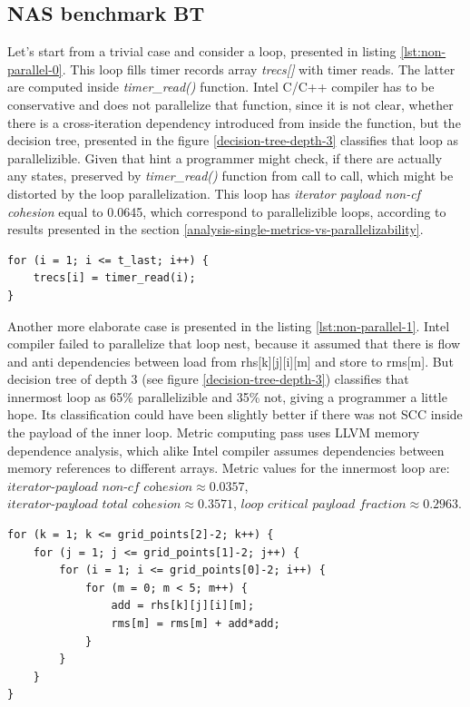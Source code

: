 \subsection{NAS benchmark BT}
\qquad Let's start from a trivial case and consider a loop, presented in listing \ref{lst:non-parallel-0}. This loop fills timer records array \textit{trecs[]} with timer reads. The latter are computed inside \textit{timer\_read()} function. Intel C/C++ compiler has to be conservative and does not parallelize that function, since it is not clear, whether there is a cross-iteration dependency introduced from inside the function, but the decision tree, presented in the figure \ref{decision-tree-depth-3} classifies that loop as parallelizible. Given that hint a programmer might check, if there are actually any states, preserved by \textit{timer\_read()} function from call to call, which might be distorted by the loop parallelization. This loop has \textit{iterator payload non-cf cohesion} equal to 0.0645, which correspond to parallelizible loops, according to results presented in the section \ref{analysis-single-metrics-vs-parallelizability}.              
\begin{lstlisting}[caption={Loop, which has not been parallelized by Intel C/C++ compiler, but does seem algorithmically parallelizible, given absense of cross-iteration dependencies introduced by the function call. }, captionpos=b, label=lst:non-parallel-0, float,floatplacement=H]
for (i = 1; i <= t_last; i++) {
	trecs[i] = timer_read(i);
}
\end{lstlisting}\newline
\null\qquad Another more elaborate case is presented in the listing \ref{lst:non-parallel-1}. Intel compiler failed to parallelize that loop nest, because it assumed that there is flow and anti dependencies between load from rhs[k][j][i][m] and store to rms[m]. But decision tree of depth 3 (see figure \ref{decision-tree-depth-3}) classifies that innermost loop as 65\% parallelizible and 35\% not, giving a programmer a little hope. Its classification could have been slightly better if there was not SCC inside the payload of the inner loop. Metric computing pass uses LLVM memory dependence analysis, which alike Intel compiler assumes dependencies between memory references to different arrays. Metric values for the innermost loop are: $\textit{iterator-payload non-cf cohesion}\approx 0.0357$, $\textit{iterator-payload total cohesion}\approx 0.3571$, $\textit{loop critical payload fraction}\approx 0.2963$.
\begin{lstlisting}[caption={Loop, which has not been parallelized by Intel C/C++ compiler due to conservative anti and flow dependencies assumptions between references to rhs and rms. But these are different arrays and the loop actually computes reduction.}, captionpos=b, label=lst:non-parallel-1, float,floatplacement=H]
for (k = 1; k <= grid_points[2]-2; k++) {
	for (j = 1; j <= grid_points[1]-2; j++) {
		for (i = 1; i <= grid_points[0]-2; i++) {
			for (m = 0; m < 5; m++) {
				add = rhs[k][j][i][m];
				rms[m] = rms[m] + add*add;
			} 
		} 
	} 
}
\end{lstlisting}\newline
